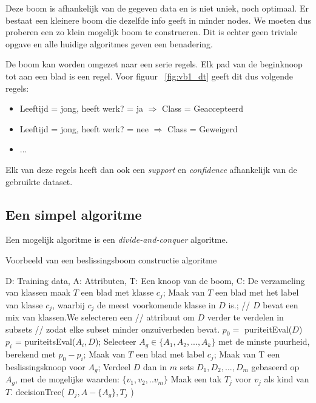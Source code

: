 Deze boom is afhankelijk van de gegeven data en is niet uniek, noch optimaal. Er bestaat een kleinere boom die dezelfde info geeft in minder nodes. We moeten dus proberen een zo klein mogelijk boom te construeren. Dit is echter geen triviale opgave en alle huidige algoritmes geven een benadering.

De boom kan worden omgezet naar een serie regels. Elk pad van de beginknoop tot aan een blad is een regel. Voor figuur ~\ref{fig:vb1_dt} geeft dit dus volgende regels:
\begin{itemize}
\item Leeftijd = jong, heeft werk? = ja $\Rightarrow$ Class = Geaccepteerd
\item Leeftijd = jong, heeft werk? = nee $\Rightarrow$ Class = Geweigerd
\item ...
\end{itemize}
Elk van deze regels heeft dan ook een \emph{support} en \emph{confidence} afhankelijk van de gebruikte dataset.

\subsection{Een simpel algoritme}
Een mogelijk algoritme is een \emph{divide-and-conquer} algoritme. 
\begin{algorithm}
\caption{Voorbeeld van een beslissingsboom constructie algoritme}
\begin{algorithmic}[1]
\Require D: Training data, A: Attributen, T: Een knoop van de boom, C: De verzameling van klassen
    \State maak $T$ een blad met klasse $c_j$;
	\State Maak van $T$ een blad met het label van klasse $c_j$,
    \State waarbij $c_j$ de meest voorkomende klasse in $D$ is.;
\Else
	\State // $D$ bevat een mix van klassen.We selecteren een 
	\State // attribuut om $D$ verder te verdelen in subsets 
	\State // zodat elke subset minder onzuiverheden bevat.
    \State $p_0 = $ puriteitEval($D$)
    	\State $p_i$ = puriteitsEval($A_i,D$); 
    \EndFor
    \State Selecteer $A_g \in \{A_1, A_2, ..., A_k\} $ met de minste puurheid,
    \State berekend met $p_0 - p_i$;
    	\State Maak van $T$ een blad met label $c_j$;
    \Else
    	\State Maak van T een beslissingsknoop voor $A_g$;
		\State Verdeel $D$ dan in $m$ sets $D_1, D_2, ..., D_m$ gebaseerd op 
        \State $A_g$, met de mogelijke waarden: $\{v_1,v_2,..v_m\}$ 
            	\State Maak een tak $T_j$ voor $v_j$ als kind van $T$.
                \State decisionTree( $D_j, A-\{A_g\}, T_j$ )
            \EndIf
        \EndFor
    \EndIf
\EndIf
\EndFunction
\end{algorithmic}
\end{algorithm}

